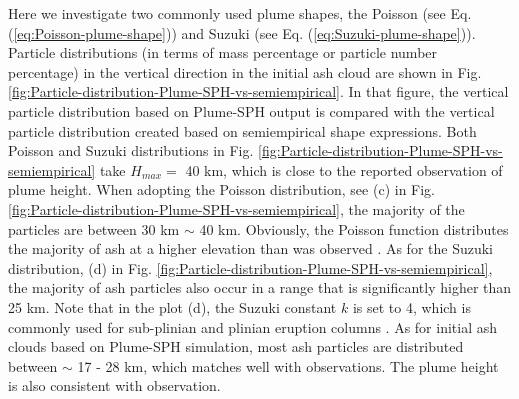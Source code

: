\documentclass[utf8]{frontiersSCNS} %
\begin{document}
Here we investigate two commonly used plume shapes, the Poisson (see Eq. (\ref{eq:Poisson-plume-shape})) and Suzuki (see Eq. (\ref{eq:Suzuki-plume-shape})).
Particle distributions (in terms of mass percentage or particle number percentage) in the vertical direction in the initial ash cloud are shown in Fig. \ref{fig:Particle-distribution-Plume-SPH-vs-semiempirical}. In that figure, the vertical particle distribution based on Plume-SPH output is compared with the vertical particle distribution created based on semiempirical shape expressions. Both Poisson and Suzuki distributions in Fig. \ref{fig:Particle-distribution-Plume-SPH-vs-semiempirical} take $H_{max} =$ 40 km, which is close to the reported observation of plume height. When adopting the Poisson distribution, see (c) in  Fig. \ref{fig:Particle-distribution-Plume-SPH-vs-semiempirical}, the majority of the particles are between 30 km $\sim$ 40 km. Obviously, the Poisson function distributes the majority of ash at a higher elevation than was observed \citep[e.g.][]{fero2008simulation}. As for the Suzuki distribution, (d) in  Fig. \ref{fig:Particle-distribution-Plume-SPH-vs-semiempirical}, the majority of ash particles also occur in a range that is significantly higher than 25 km. Note that in the plot (d), the Suzuki constant $k$ is set to 4, which is commonly used for sub-plinian and plinian eruption columns \citep{pfeiffer2005model}. As for initial ash clouds based on Plume-SPH simulation, most ash particles are distributed between $\sim$ 17 - 28 km, which matches well with observations. The plume height is also consistent with observation.
\end{document}
